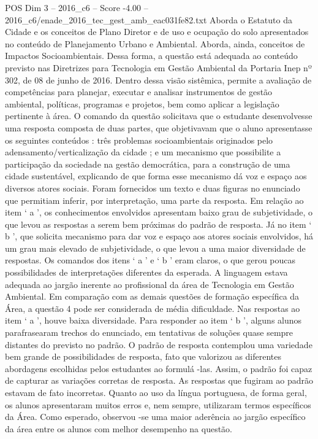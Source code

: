 \begin{textsample}{POS Dim 3 – 2016\_c6 – Score -4.00 – 2016\_c6/enade\_2016\_tec\_gest\_amb\_eac031fe82.txt}
Aborda o Estatuto da Cidade e os conceitos de Plano Diretor e de uso e ocupação do solo apresentados no conteúdo de Planejamento Urbano e Ambiental.
Aborda, ainda, conceitos de Impactos Socioambientais.
Dessa forma, a questão está adequada ao conteúdo previsto nas Diretrizes para Tecnologia em Gestão Ambiental da Portaria Inep nº 302, de 08 de junho de 2016.
Dentro dessa visão sistêmica, permite a avaliação de competências para planejar, executar e analisar instrumentos de gestão ambiental, políticas, programas e projetos, bem como aplicar a legislação pertinente à área.
O comando da questão solicitava que o estudante desenvolvesse uma resposta composta de duas partes, que objetivavam que o aluno apresentasse os seguintes conteúdos : três problemas socioambientais originados pelo adensamento/verticalização da cidade ; e um mecanismo que possibilite a participação da sociedade na gestão democrática, para a construção de uma cidade sustentável, explicando de que forma esse mecanismo dá voz e espaço aos diversos atores sociais.
Foram fornecidos um texto e duas figuras no enunciado que permitiam inferir, por interpretação, uma parte da resposta.
Em relação ao item ‘ a ’, os conhecimentos envolvidos apresentam baixo grau de subjetividade, o que levou as respostas a serem bem próximas do padrão de resposta.
Já no item ‘ b ’, que solicita mecanismo para dar voz e espaço aos atores sociais envolvidos, há um grau mais elevado de subjetividade, o que levou a uma maior diversidade de respostas.
Os comandos dos itens ‘ a ’ e ‘ b ’ eram claros, o que gerou poucas possibilidades de interpretações diferentes da esperada.
A linguagem estava adequada ao jargão inerente ao profissional da área de Tecnologia em Gestão Ambiental.
Em comparação com as demais questões de formação específica da Área, a questão 4 pode ser considerada de média dificuldade.
Nas respostas ao item ‘ a ’, houve baixa diversidade.
Para responder ao item ‘ b ’, alguns alunos parafrasearam trechos do enunciado, em tentativas de soluções quase sempre distantes do previsto no padrão.
O padrão de resposta contemplou uma variedade bem grande de possibilidades de resposta, fato que valorizou as diferentes abordagens escolhidas pelos estudantes ao formulá -las.
Assim, o padrão foi capaz de capturar as variações corretas de resposta.
As respostas que fugiram ao padrão estavam de fato incorretas.
Quanto ao uso da língua portuguesa, de forma geral, os alunos apresentaram muitos erros e, nem sempre, utilizaram termos específicos da Área.
Como esperado, observou -se uma maior aderência ao jargão específico da área entre os alunos com melhor desempenho na questão.

\end{textsample}

